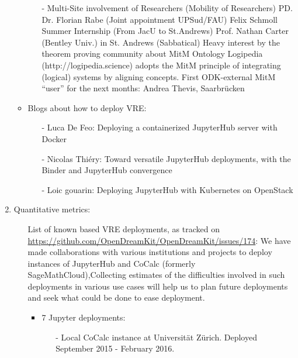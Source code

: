 \begin{enumerate}
\begin{itemize}
\begin{itemize}
\item[-]
Multi-Site involvement of Researchers (Mobility of Researchers)
PD. Dr. Florian Rabe (Joint appointment UPSud/FAU)
Felix Schmoll Summer Internship (From JacU to St.Andrews)
Prof. Nathan Carter (Bentley Univ.) in St. Andrews (Sabbatical)
Heavy interest by the theorem proving community about MitM Ontology
Logipedia (http://logipedia.science) adopts the MitM principle of integrating (logical) systems by aligning concepts.
First ODK-external MitM “user” for the next months: Andrea Thevis, Saarbrücken 
\end{itemize}

\item Blogs about how to deploy VRE:
\begin{itemize}
\item[-] Luca De Feo: Deploying a containerized JupyterHub server with Docker %
\item[-]Nicolas Thiéry: Toward versatile JupyterHub deployments, with the Binder and JupyterHub convergence %
\item[-]Loic gouarin: Deploying JupyterHub with Kubernetes on OpenStack %
  \end{itemize}
    \end{itemize}
    
\item Quantitative metrics:
\begin{itemize}
\item[List of known \ODK based VRE deployments, as tracked on \url{https://github.com/OpenDreamKit/OpenDreamKit/issues/174}:] We have made 
collaborations with various institutions and projects to deploy instances of JupyterHub and CoCalc (formerly SageMathCloud),Collecting 
estimates of the difficulties involved in such deployments in various use cases will help us to plan future 
deployments and seek what could be done to ease deployment.

\begin{itemize}
\item 7 Jupyter deployments:%
\begin{itemize}
\item[-]Local CoCalc instance at Universität Zürich. Deployed September 2015 - February 2016.


\end{itemize}
\end{itemize}
\end{itemize}
\end{enumerate}
